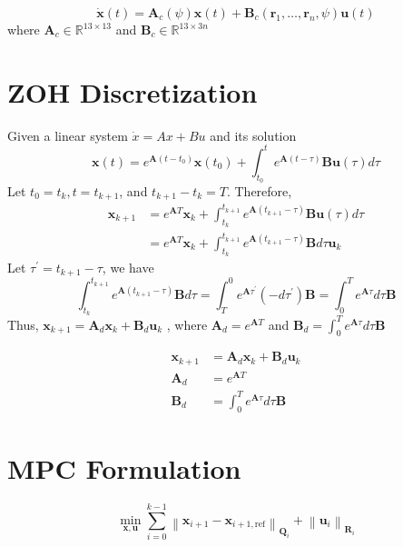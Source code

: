 \documentclass{article}
\begin{document}
$$
\dot{\mathbf{x}}(t)=\mathbf{A}_{c}(\psi) \mathbf{x}(t)+\mathbf{B}_{c}\left(\mathbf{r}_{1}, \ldots, \mathbf{r}_{n}, \psi\right) \mathbf{u}(t)
$$
where $\mathbf{A}_{c} \in \mathbb{R}^{13 \times 13}$ and $\mathbf{B}_{c} \in \mathbb{R}^{13 \times 3 n}$


\section{ZOH Discretization}

Given a linear system $\dot{x} = Ax+Bu$ and its solution 
$$
\mathbf{x}(t)=e^{\mathbf{A}\left(t-t_{0}\right)} \mathbf{x}\left(t_{0}\right)+\int_{t_{0}}^{t} e^{\mathbf{A}(t-\tau)} \mathbf{B u}(\tau) d \tau
$$
Let $t_{0}=t_{k}, t=t_{k+1}$, and $t_{k+1}-t_{k}=T$. Therefore,
$$
\begin{aligned}
\mathbf{x}_{k+1} &=e^{\mathbf{A} T} \mathbf{x}_{k}+\int_{t_{k}}^{t_{k+1}} e^{\mathbf{A}\left(t_{k+1}-\tau\right)} \mathbf{B u}(\tau) d \tau \\
&=e^{\mathbf{A} T} \mathbf{x}_{k}+\int_{t_{k}}^{t_{k+1}} e^{\mathbf{A}\left(t_{k+1}-\tau\right)} \mathbf{B} d \tau \mathbf{u}_{k}
\end{aligned}
$$
Let $\tau^{\prime}=t_{k+1}-\tau$, we have
$$
\int_{t_{k}}^{t_{k+1}} e^{\mathbf{A}\left(t_{k+1}-\tau\right)} \mathbf{B} d \tau=\int_{T}^{0} e^{\mathbf{A} \tau^{\prime}}\left(-d \tau^{\prime}\right) \mathbf{B}=\int_{0}^{T} e^{\mathbf{A} \tau} d \tau \mathbf{B}
$$
Thus,
$\mathbf{x}_{k+1} =\mathbf{A}_{d} \mathbf{x}_{k}+\mathbf{B}_{d} \mathbf{u}_{k}$
, where 
$\mathbf{A}_{d} =e^{\mathbf{A} T}$ 
and 
$\mathbf{B}_{d} =\int_{0}^{T} e^{\mathbf{A} \tau} d \tau \mathbf{B}$

\begin{align}
    \mathbf{x}_{k+1} &=\mathbf{A}_{d} \mathbf{x}_{k}+\mathbf{B}_{d} \mathbf{u}_{k} \\
    \mathbf{A}_{d} &=e^{\mathbf{A} T} \\
    \mathbf{B}_{d} &=\int_{0}^{T} e^{\mathbf{A} \tau} d \tau \mathbf{B}
\end{align}

\section{MPC Formulation}

$$
\min _{\mathbf{x}, \mathbf{u}} \sum_{i=0}^{k-1}\left\|\mathbf{x}_{i+1}-\mathbf{x}_{i+1, \mathrm{ref}}\right\|_{\mathbf{Q}_{i}}+\left\|\mathbf{u}_{i}\right\|_{\mathbf{R}_{i}}
$$
\end{document}
